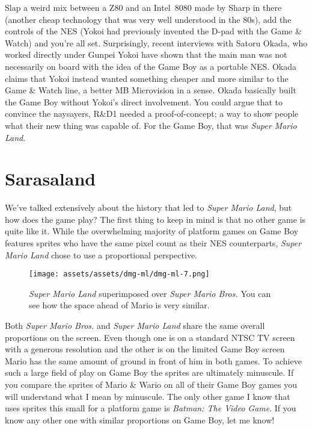 \documentclass{book}
\begin{document}
Slap a weird mix between a Z80 and an Intel~8080 made by Sharp in there (another cheap technology that was very well understood in the 80s), add the controls of the NES (Yokoi had previously invented the D-pad with the Game \& Watch) and you’re all set. Surprisingly, recent interviews with Satoru Okada, who worked directly under Gunpei Yokoi have shown that the main man was not necessarily on board with the idea of the Game Boy as a portable NES. Okada claims that Yokoi instead wanted something cheaper and more similar to the Game \& Watch line, a better MB Microvision in a sense. Okada basically built the Game Boy without Yokoi’s direct involvement. You could argue that to convince the naysayers, R\&D1 needed a proof-of-concept; a way to show people what their new thing was capable of. For the Game Boy, that was \emph{Super Mario Land}.

\FloatBarrier\needspace{10mm}\section*{Sarasaland}\nopagebreak[4]

We’ve talked extensively about the history that led to \emph{Super Mario Land}, but how does the game play? The first thing to keep in mind is that no other game is quite like it. While the overwhelming majority of platform games on Game Boy features sprites who have the same pixel count as their NES counterparts, \emph{Super Mario Land} chose to use a proportional perspective.

\begin{figure}[hbt]
\vskip 10pt
\centering \texttt{[image: assets/assets/dmg-ml/dmg-ml-7.png]}\par\pagetwodescription \emph{Super Mario Land} superimposed over \emph{Super Mario Bros.} You can see how the space ahead of Mario is very similar.
\vskip 6pt
\end{figure}

Both \emph{Super Mario Bros.} and \emph{Super Mario Land} share the same overall proportions on the screen. Even though one is on a standard NTSC TV screen with a generous resolution and the other is on the limited Game Boy screen Mario has the same amount of ground in front of him in both games. To achieve such a large field of play on Game Boy the sprites are ultimately minuscule. If you compare the sprites of Mario \& Wario on all of their Game Boy games you will understand what I mean by minuscule. The only other game I know that uses sprites this small for a platform game is \emph{Batman: The Video Game}. If you know any other one with similar proportions on Game Boy, let me know!
\end{document}
